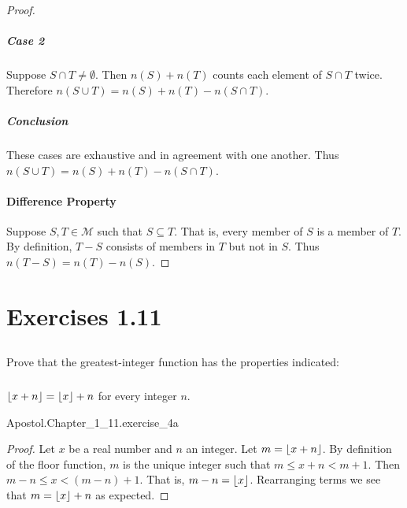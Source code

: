 \documentclass{report}
\begin{document}
\begin{proof}
      \subparagraph{Case 2}%

        Suppose $S \cap T \neq \emptyset$.
        Then $n(S) + n(T)$ counts each element of $S \cap T$ twice.
        Therefore $n(S \cup T) = n(S) + n(T) - n(S \cap T)$.

      \subparagraph{Conclusion}%

        These cases are exhaustive and in agreement with one another.
        Thus $n(S \cup T) = n(S) + n(T) - n(S \cap T)$.

    \paragraph{Difference Property}%

      Suppose $S, T \in \mathscr{M}$ such that $S \subseteq T$.
      That is, every member of $S$ is a member of $T$.
      By definition, $T - S$ consists of members in $T$ but not in $S$.
      Thus $n(T - S) = n(T) - n(S)$.

  \end{proof}

\section{Exercises 1.11}%

\subsection{}%

  Prove that the greatest-integer function has the properties indicated:

\subsubsection{}%

  $\left\lfloor x + n\right\rfloor = \left\lfloor x\right\rfloor + n$ for every integer $n$.

    {Apostol.Chapter\_1\_11.exercise\_4a}

  \begin{proof}
    Let $x$ be a real number and $n$ an integer.
    Let $m = \left\lfloor x + n\right\rfloor$.
    By definition of the floor function, $m$ is the unique integer such that
      $m \leq x + n < m + 1$.
    Then $m - n \leq x < (m - n) + 1$.
    That is, $m - n = \left\lfloor x\right\rfloor$.
    Rearranging terms we see that $m = \left\lfloor x\right\rfloor + n$ as expected.
  \end{proof}
\end{document}
